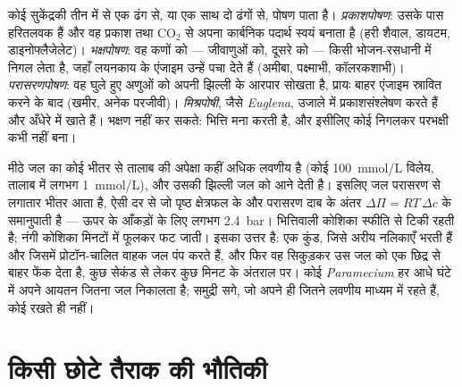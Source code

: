 \begin{definition}[पोषण के ढंग]\label{def:b2:unicellular-diversity:nutrition}
कोई  सुकेंद्रकी तीन में से एक ढंग से, या एक साथ दो ढंगों से,
पोषण पाता है। \emph{प्रकाशपोषण}: उसके पास हरितलवक हैं और वह प्रकाश तथा
$\mathrm{CO_2}$ से अपना कार्बनिक पदार्थ स्वयं बनाता है (हरी शैवाल,
डायटम, डाइनोफ्लैजेलेट)। \emph{भक्षपोषण}: वह कणों को --- जीवाणुओं को,
दूसरे  को --- किसी भोजन-रसधानी में निगल लेता है, जहाँ लयनकाय
के एंजाइम उन्हें पचा देते हैं (अमीबा, पक्ष्माभी, कॉलरकशाभी)।
\emph{परासरणपोषण}: वह घुले हुए अणुओं को अपनी झिल्ली के आरपार सोखता है,
प्रायः बाहर एंजाइम स्रावित करने के बाद (खमीर, अनेक परजीवी)।
\emph{मिश्रपोषी}, जैसे \emph{Euglena}, उजाले में प्रकाशसंश्लेषण करते हैं
और अँधेरे में खाते हैं।  भक्षण नहीं कर सकते: भित्ति मना
करती है, और इसीलिए कोई  निगलकर परभक्षी कभी नहीं बना।
\end{definition}

\begin{proposition}\label{prop:b2:unicellular-diversity:osmoregulation}
मीठे जल का कोई  भीतर से तालाब की अपेक्षा कहीं अधिक लवणीय है
(कोई \qty{100}{mmol/L} विलेय, तालाब में लगभग \qty{1}{mmol/L}), और उसकी
झिल्ली जल को आने देती है। इसलिए जल परासरण से लगातार भीतर आता है, ऐसी दर
से जो पृष्ठ क्षेत्रफल के और परासरण दाब के अंतर
$\Delta\Pi = RT\,\Delta c$ के समानुपाती है --- ऊपर के आँकड़ों के लिए
लगभग \qty{2.4}{bar}। भित्तिवाली कोशिका स्फीति से टिकी रहती है; नंगी
कोशिका मिनटों में फूलकर फट जाती। \emph{} इसका उत्तर है:
एक कुंड, जिसे अरीय नलिकाएँ भरती हैं और जिसमें प्रोटॉन-चालित वाहक जल
पंप करते हैं, और फिर वह सिकुड़कर उस जल को एक छिद्र से बाहर फेंक देता है,
कुछ सेकंड से लेकर कुछ मिनट के अंतराल पर। कोई \emph{Paramecium} हर आधे
घंटे में अपने आयतन जितना जल निकालता है; समुद्री सगे, जो अपने ही जितने
लवणीय माध्यम में रहते हैं, कोई  रखते ही नहीं।
\end{proposition}

\section{किसी छोटे तैराक की भौतिकी}

